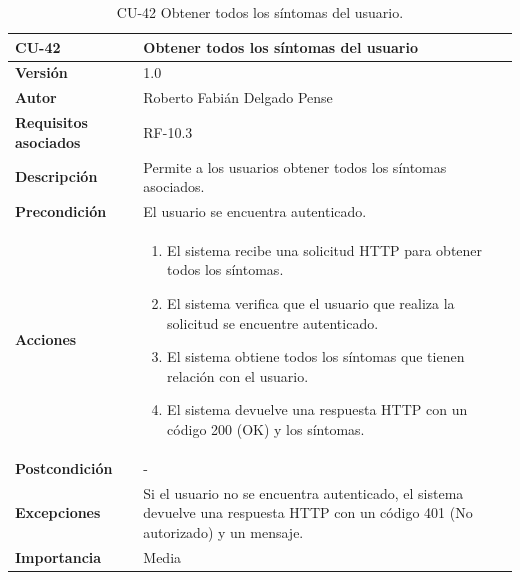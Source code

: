 \begin{table}[p]
	\centering
	\begin{tabularx}{\linewidth}{ p{} p{} }
		\toprule
		\textbf{CU-42}    & \textbf{Obtener todos los síntomas del usuario}\\
		\toprule
		\textbf{Versión}              & 1.0    \\
		\textbf{Autor}                & Roberto Fabián Delgado Pense \\
		\textbf{Requisitos asociados} & RF-10.3 \\ 
		\textbf{Descripción}          & Permite a los usuarios obtener todos los síntomas asociados. \\
		\textbf{Precondición}         & El usuario se encuentra autenticado. \\  
		\textbf{Acciones}             &
		\begin{enumerate}
			\def\labelenumi{\arabic{enumi}.}
			\tightlist
			\item El sistema recibe una solicitud HTTP para obtener todos los síntomas.
                \item El sistema verifica que el usuario que realiza la solicitud se encuentre autenticado.
			\item El sistema obtiene todos los síntomas que tienen relación con el usuario.
                \item El sistema devuelve una respuesta HTTP con un código 200 (OK) y los síntomas.         
            \end{enumerate}\\
		\textbf{Postcondición}        & -  \\
		\textbf{Excepciones}          &  Si el usuario no se encuentra autenticado, el 
                    sistema devuelve una respuesta HTTP con un código 401 (No autorizado) y un mensaje.\\
		\textbf{Importancia}          & Media \\
		\bottomrule
	\end{tabularx}
	\caption{CU-42 Obtener todos los síntomas del usuario.}
\end{table}

